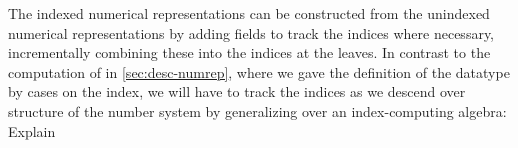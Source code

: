 The indexed numerical representations can be constructed from the unindexed numerical representations by adding fields to track the indices where necessary, incrementally combining these into the indices at the leaves. In contrast to the computation of  in \autoref{sec:desc-numrep}, where we gave the definition of the datatype by cases on the index, we will have to track the indices as we descend over structure of the number system by generalizing over an index-computing algebra: 
Explain

